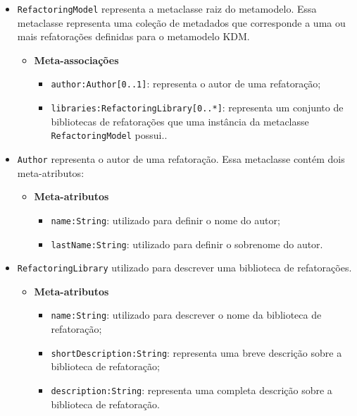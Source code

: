 \begin{itemize}
\item \texttt{RefactoringModel} representa a metaclasse raiz do metamodelo. Essa metaclasse representa uma coleção de metadados que corresponde a uma ou mais refatorações definidas para o metamodelo KDM.

\begin{itemize}
	\item \textbf{Meta-associações}
		\begin{itemize}
			\item \texttt{author:Author[0..1]}: representa o autor de uma refatoração; 
			\item \texttt{libraries:RefactoringLibrary[0..*]}: representa um conjunto de bibliotecas de refatorações que uma instância da metaclasse \texttt{RefactoringModel} possui..
		\end{itemize}
\end{itemize}

\item \texttt{Author} representa o autor de uma refatoração. Essa metaclasse contém dois meta-atributos:

\begin{itemize}
	\item \textbf{Meta-atributos}
		\begin{itemize}
			\item \texttt{name:String}: utilizado para definir o nome do autor;
			\item \texttt{lastName:String}: utilizado para definir o sobrenome do autor.
		\end{itemize}	
\end{itemize} 

\item \texttt{RefactoringLibrary} utilizado para descrever uma biblioteca de refatorações.

\begin{itemize}
	\item \textbf{Meta-atributos}
		\begin{itemize}
			\item \texttt{name:String}: utilizado para descrever o nome da biblioteca de refatoração;
			\item \texttt{shortDescription:String}: representa uma breve descrição sobre a biblioteca de refatoração;
			\item \texttt{description:String}: representa uma completa descrição sobre a biblioteca de refatoração.
		\end{itemize}	
\end{itemize} 


\end{itemize}
